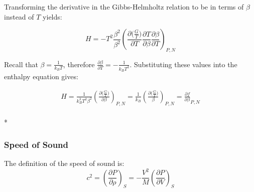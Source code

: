 \documentclass[aps,pre,nofootinbib,superscriptaddress,linenumbers,10pt, draft,tightenlines]{revtex4-1}
\begin{document}
\begin{itemize}
\begin{itemize}
    	Transforming the derivative in the Gibbs-Helmholtz relation to be in terms of $\beta$ instead of $T$ yields:
    	
    	\begin{equation}H=-T^2  \frac{\beta^2}{\beta^2}\left(\frac{\partial \big(\frac{G}{T}\big)}{\partial T} \frac{\partial T}{\partial \beta} \frac{\partial \beta}{\partial T}\right)_{P,N}\end{equation}
    	
    	
    	Recall that $\beta = \frac{1}{k_B T}$, therefore $\frac{\partial \beta}{\partial T} = - \frac{1}{k_B T^2}$. Substituting these values into the enthalpy equation gives:
    	
    	\begin{multline}
    	H = \frac{1}{k_B^3 T^2 \beta^2} \left(\frac{\partial \big(\frac{G}{T}\big)}{\partial \beta}\right)_{P,N}  = \frac{1}{k_B} \left(\frac{\partial \big(\frac{G}{T}\big)}{\beta}\right)_{P,N} = \frac{\partial f}{\partial \beta}_{P,N} 
    	\end{multline}\\*
    	
    	
    	
        \subsubsection{Speed of Sound}
        The definition of the speed of sound is\cite{sos}:
        \begin{equation}c^2 = \left(\frac{\partial P}{\partial \rho}\right)_{S} = -\frac{V^2}{M}\left(\frac{\partial P}{\partial V}\right)_{S}\end{equation}
        
        

\end{itemize}
\end{itemize}
\end{document}

